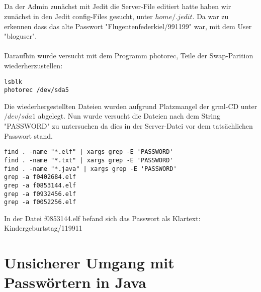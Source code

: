 \documentclass[12pt]{article}
\theoremstyle{plain}
\begin{document}
\subsection{}
Da der Admin zunächst mit Jedit die Server-File editiert hatte haben wir zunächst in den Jedit config-Files gesucht, unter $home/.jedit$. Da war zu erkennen dass das alte Passwort "Flugentenfederkiel/991199" war, mit dem User "bloguser". \\ \\ Daraufhin wurde versucht mit dem Programm photorec, Teile der Swap-Parition wiederherzustellen:
\begin{lstlisting}
lsblk
photorec /dev/sda5
\end{lstlisting}
Die wiederhergestellten Dateien wurden aufgrund Platzmangel der grml-CD unter $/dev/sda1$ abgelegt. Nun wurde versucht die Dateien nach dem String "PASSWORD" zu untersuchen da dies in der Server-Datei vor dem tatsächlichen Passwort stand.
\begin{lstlisting}
find . -name "*.elf" | xargs grep -E 'PASSWORD'
find . -name "*.txt" | xargs grep -E 'PASSWORD'
find . -name "*.java" | xargs grep -E 'PASSWORD'
grep -a f0402684.elf
grep -a f0853144.elf
grep -a f0932456.elf
grep -a f0052256.elf
\end{lstlisting}
In der Datei f0853144.elf befand sich das Passwort als Klartext: Kindergeburtstag/119911
\section{Unsicherer Umgang mit Passwörtern in Java}
\end{document}
